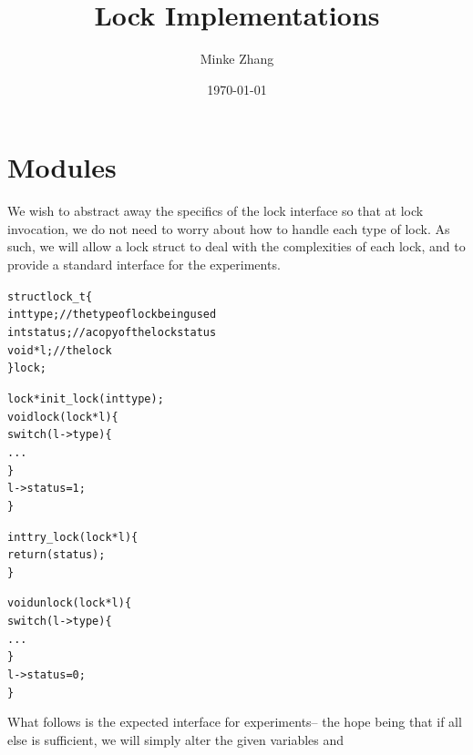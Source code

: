 \documentclass{article}
\newcommand{\tb}[1]{\textbf{#1}}
\newcommand{\cpart}[1]{\newblock{\LARGE {\\\\#1}}}
\begin{document}

\title{\tb{Lock Implementations}}
\author{Minke Zhang\hspace*{-\tabcolsep}}
\date{\today}

\begingroup
\let\center\flushright
\let\endcenter\endflushright
\maketitle
\endgroup

\section{Modules}

\cpart{Locks}

We wish to abstract away the specifics of the lock interface so that at lock invocation, we do not need to worry about how to handle each type of lock. As such, we 
will allow a lock struct to deal with the complexities of each lock, and to provide a standard interface for the experiments.

\begin{alltt}
struct lock_t \{
  int type;             // the type of lock being used
  int status;           // a copy of the lock status
  void *l;              // the lock
\} lock;

lock *init_lock(int type);
void lock(lock *l) \{
  switch(l->type) \{
    ...
  \}
  l->status = 1;
\}

int try_lock(lock *l) \{
  return(status);
\}

void unlock(lock *l) \{
  switch(l->type) \{
    ...
  \}
  l->status = 0;
\}
\end{alltt}

\cpart{Experiment Interfaces}

What follows is the expected interface for experiments-- the hope being that if all else is sufficient, we will simply alter the given variables and
\end{document}

